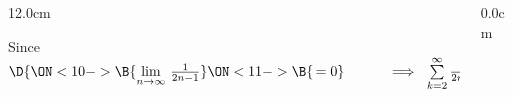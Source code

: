 \begin{frame}
\begin{columns}
\begin{column}{12.0cm}
\vspace{0.7cm}

Since \quad $\D{
\ON<10->{\B{\lim \limits_{n \to \infty}\,\frac{1}{2n-1}}}
\ON<11->{\B{\, = 0}} \hspace{1.0cm} 
\implies \,\, 
\sum \limits_{k=2}^{\infty} \frac{1}{2n-1}}$ 

\vspace{1.2cm}

\end{column}
\begin{column}{0.0cm}\end{column}
\end{columns}
\end{frame}

